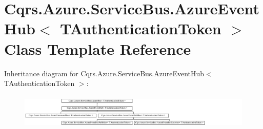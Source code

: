 \hypertarget{classCqrs_1_1Azure_1_1ServiceBus_1_1AzureEventHub}{}\section{Cqrs.\+Azure.\+Service\+Bus.\+Azure\+Event\+Hub$<$ T\+Authentication\+Token $>$ Class Template Reference}
\label{classCqrs_1_1Azure_1_1ServiceBus_1_1AzureEventHub}
Inheritance diagram for Cqrs.\+Azure.\+Service\+Bus.\+Azure\+Event\+Hub$<$ T\+Authentication\+Token $>$\+:\begin{figure}[H]
\begin{center}
\leavevmode
\includegraphics[height=1.689291cm]{classCqrs_1_1Azure_1_1ServiceBus_1_1AzureEventHub}
\end{center}
\end{figure}
